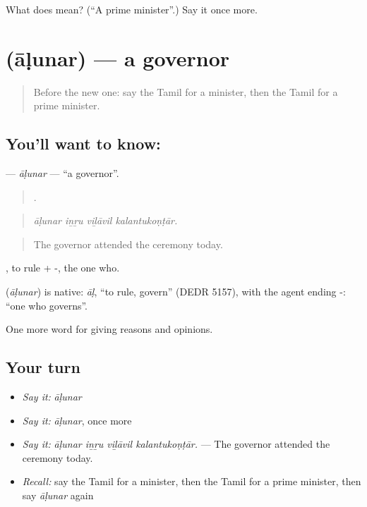 \begin{tcolorbox}[breakable,colback=teal!4,colframe=teal!35!black,title={Before you move on}]
What does  mean? (\textquotedblleft{}A prime minister\textquotedblright{}.) Say it once more.
\end{tcolorbox}
\section[\texorpdfstring{\ta{ஆளுநர்} (āḷunar)}{ஆளுநர் (āḷunar)}]{ (āḷunar) — a governor}

\label{lesson:TA-C373-alunar}



\begin{quote}
Before the new one: say the Tamil for a minister, then the Tamil for a prime minister.
\end{quote}

\subsection*{You'll want to know: }
\textbf{} — \emph{āḷunar} — \textquotedblleft{}a governor\textquotedblright{}.

\begin{quote}
   .
\end{quote}

\begin{quote}
\emph{āḷunar iṉṟu viḻāvil kalantukoṇṭār.}
\end{quote}

\begin{quote}
The governor attended the ceremony today.
\end{quote}

, to rule + -, the one who.

\begin{cousinweb}
\textbf{} (\emph{āḷunar}) is native: \emph{āḷ}, \textquotedblleft{}to rule, govern\textquotedblright{} (DEDR 5157), with the agent ending -: \textquotedblleft{}one who governs\textquotedblright{}.
\end{cousinweb}

\begin{grammarlens}[title={What you've built}]
One more word for giving reasons and opinions.
\end{grammarlens}

\subsection*{Your turn}
\begin{itemize}
\raggedright
  \item \emph{Say it:} \emph{āḷunar}
  \item \emph{Say it:} \emph{āḷunar}, once more
  \item \emph{Say it:} \emph{āḷunar iṉṟu viḻāvil kalantukoṇṭār.} — The governor attended the ceremony today.
  \item \emph{Recall:} say the Tamil for a minister, then the Tamil for a prime minister, then say \emph{āḷunar} again
\end{itemize}

